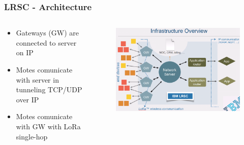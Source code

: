 \begin{frame}[fragile]
  \frametitle{LRSC - Architecture}
  \begin{columns}
    \begin{column}{.48\linewidth}
    	\begin{itemize}
	  \item Gateways (GW) are connected to server on IP
	  \item Motes comunicate with server in tunneling TCP/UDP over IP
	  \item Motes comunicate with GW with LoRa single-hop
    	\end{itemize}
    \end{column}
    \hfill
    \begin{column}{.48\linewidth}
    	\begin{figure}
	  \centering
	  \includegraphics[width=\linewidth]{img/LRSC_infrastructure.png}
    	\end{figure}

    \end{column}
  \end{columns}
\end{frame}

